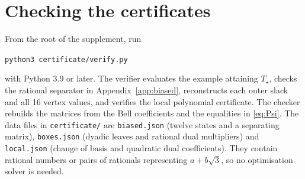 \documentclass[11pt]{article}
\theoremstyle{definition}
\newcommand{\Tq}{T_{\star}}
\begin{document}
\appendix
\section{Checking the certificates}\label{app:repro}
From the root of the supplement, run
\begin{center}\texttt{python3 certificate/verify.py}\end{center}
with Python 3.9 or later. The verifier evaluates the example attaining $\Tq$, checks the rational
separator in Appendix~\ref{app:biased}, reconstructs each outer slack and all 16 vertex
values, and verifies the local polynomial certificate. The checker rebuilds the matrices
from the Bell coefficients and the equalities in \eqref{eq:Psi}. The data files in
\texttt{certificate/} are \texttt{biased.json} (twelve states and a separating matrix),
\texttt{boxes.json} (dyadic leaves and rational dual multipliers) and \texttt{local.json}
(change of basis and quadratic dual coefficients). They contain rational numbers or pairs of
rationals representing $a+b\sqrt3$, so no optimisation solver is needed.


\clearpage


\clearpage


\end{document}

